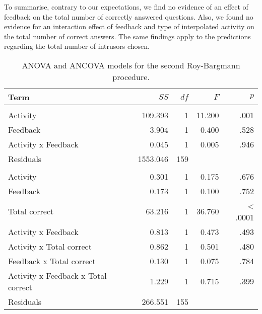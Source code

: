To summarise, contrary to our expectations, we find no evidence of an
effect of feedback on the total number of correctly answered questions.
Also, we found no evidence for an interaction effect of feedback and
type of interpolated activity on the total number of correct answers.
The same findings apply to the predictions regarding the total number of
intrusors chosen.

\begin{table*}

\caption{\label{tab:rb2Table}\label{rb2-table}ANOVA and ANCOVA models for the second Roy-Bargmann
                     procedure.}
\centering
\begin{tabular}[t]{lrrrr}
\toprule
Term & $SS$ & $df$ & $F$ & $p$\\
\midrule
\addlinespace[0.3em]
\multicolumn{5}{l}{\textbf{ANOVA}}\\
\hspace{1em}Activity & 109.393 & 1 & 11.200 & .001\\
\hspace{1em}Feedback & 3.904 & 1 & 0.400 & .528\\
\hspace{1em}Activity x Feedback & 0.045 & 1 & 0.005 & .946\\
\hspace{1em}Residuals & 1553.046 & 159 &  & \\
\addlinespace[0.3em]
\multicolumn{5}{l}{\textbf{ANCOVA}}\\
\hspace{1em}Activity & 0.301 & 1 & 0.175 & .676\\
\hspace{1em}Feedback & 0.173 & 1 & 0.100 & .752\\
\hspace{1em}Total correct & 63.216 & 1 & 36.760 & < .0001\\
\hspace{1em}Activity x Feedback & 0.813 & 1 & 0.473 & .493\\
\hspace{1em}Activity x Total correct & 0.862 & 1 & 0.501 & .480\\
\hspace{1em}Feedback x Total correct & 0.130 & 1 & 0.075 & .784\\
\hspace{1em}Activity x Feedback x Total correct & 1.229 & 1 & 0.715 & .399\\
\hspace{1em}Residuals & 266.551 & 155 &  & \\
\bottomrule
\end{tabular}
\end{table*}

